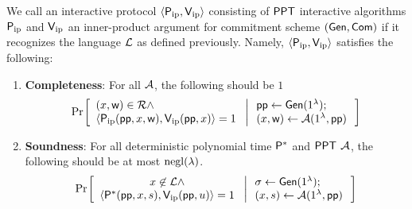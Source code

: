 \begin{definition}\label{defn:innerproductarg} 
We call an interactive protocol $\langle \mathsf{P}_\mathrm{ip},\mathsf{V}_\mathrm{ip}\rangle$ consisting of $\mathsf{PPT}$ interactive algorithms $\mathsf{P}_\mathrm{ip}$ and $\mathsf{V}_\mathrm{ip}$ an inner-product argument for commitment scheme $(\mathsf{Gen},\mathsf{Com})$ if it recognizes the language $\mathcal{L}$ as defined previously. Namely, $\langle \mathsf{P}_\mathrm{ip},\mathsf{V}_\mathrm{ip}\rangle$ satisfies the following:
\begin{enumerate}[{\rm (i)}]
\item {\bf Completeness}: For all   $\mathcal{A}$, the following should be $1$
\footnotesize %
\begin{align*}
\condprob{
	\begin{array}{l}
	(\stmt,\wit)\in \calR \wedge \\ \langle \pip(\mathsf{pp},\stmt,\wit),\vip(\mathsf{pp},\stmt)\rangle=1
	\end{array}}{
	\begin{array}{l}
	\mathsf{pp}\gets \gen(\secparam);\\
	(\stmt,\wit)\gets \adv(\secparam,\mathsf{pp})
	\end{array}
}
\end{align*}
\normalsize

\item{\bf Soundness}: For all deterministic polynomial time $\mathsf{P}^*$ and $\mathsf{PPT}$  $\mathcal{A}$, the following should be at most $\mathrm{negl}(\lambda)$.
\footnotesize %
\begin{align*}
\condprob{
	\begin{array}{c}
	\stmt\not\in \calL \wedge \\
	\langle
\prover^*(\mathsf{pp},\stmt,s),\vip(\mathsf{pp},u)\rangle=1
\end{array}}{
\begin{array}{l}
\sigma\gets \gen(\secparam);\\
(\stmt,s)\gets \adv(\secparam,\mathsf{pp})
\end{array}
} 
\end{align*}

\end{enumerate}

\end{definition}

